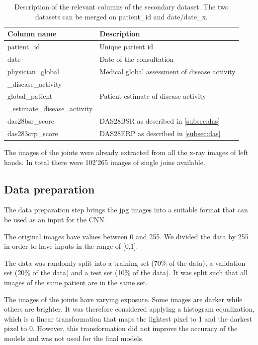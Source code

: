\documentclass[12pt]{article}
\begin{document}
\begin{table}[ht]
\centering
\caption{Description of the relevant columns of the secondary dataset. The two datasets can be merged on patient\_id and date/date\_x.}
\label{tab:sec_dataset}
\begin{tabular}{@{}ll@{}}
\toprule
Column name   & Description                                           \\ \midrule
patient\_id   & Unique patient id                                     \\
date       & Date of the consultation                              \\
physician\_global & Medical global assessment of disease activity\\
\_disease\_activity    \\   
global\_patient & Patient estimate of disease activity   \\
\_estimate\_disease\_activity    \\ 
das28bsr\_score    & DAS28BSR as described in \autoref{subsec:das}             \\
das283crp\_score & DAS28ERP as described in \autoref{subsec:das} \\ \bottomrule
\end{tabular}
\end{table}

The images of the joints were already extracted from all the x-ray images of left hands. In total there were 102'265 images of single joins available.

\subsection{Data preparation}
\label{subsec:data_prep}

The data preparation step brings the jpg images into a suitable format that can be used as an input for the CNN. 

The original images have values between 0 and 255. We divided the data by 255 in order to have inputs in the range of [0,1].

The data was randomly split into a training set (70\% of the data), a validation set (20\% of the data) and a test set (10\% of the data). It was split such that all images of the same patient are in the same set.

The images of the joints have varying exposure. Some images are darker while others are brighter. It was therefore considered applying a histogram equalization, which is a linear transformation that maps the lightest pixel to 1 and the darkest pixel to 0. However, this transformation did not improve the accuracy of the models and was not used for the final models.
\end{document}
